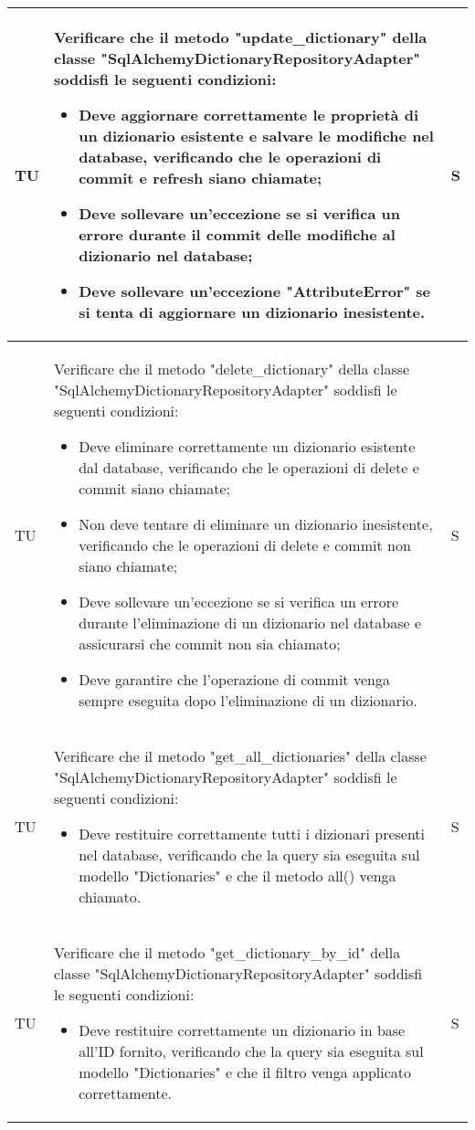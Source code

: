 \begin{adjustwidth}{-0.5cm}{-0.5cm}
\begin{longtable}{|P{1.5cm}|>{\raggedright}P{9.5cm}|>{\arraybackslash}P{1.5cm}|}
		\hline TU & Verificare che il metodo "update\_dictionary" della classe "SqlAlchemyDictionaryRepositoryAdapter" soddisfi le seguenti condizioni:
		\begin{itemize}
			\item Deve aggiornare correttamente le proprietà di un dizionario esistente e salvare le modifiche nel database, verificando che le operazioni di commit e refresh siano chiamate;
			\item Deve sollevare un'eccezione se si verifica un errore durante il commit delle modifiche al dizionario nel database;
			\item Deve sollevare un'eccezione "AttributeError" se si tenta di aggiornare un dizionario inesistente.
		\end{itemize} & S \\

		\hline TU & Verificare che il metodo "delete\_dictionary" della classe "SqlAlchemyDictionaryRepositoryAdapter" soddisfi le seguenti condizioni:
		\begin{itemize}
			\item Deve eliminare correttamente un dizionario esistente dal database, verificando che le operazioni di delete e commit siano chiamate;
			\item Non deve tentare di eliminare un dizionario inesistente, verificando che le operazioni di delete e commit non siano chiamate;
			\item Deve sollevare un'eccezione se si verifica un errore durante l'eliminazione di un dizionario nel database e assicurarsi che commit non sia chiamato;
			\item Deve garantire che l'operazione di commit venga sempre eseguita dopo l'eliminazione di un dizionario.
		\end{itemize} & S \\

		\hline TU & Verificare che il metodo "get\_all\_dictionaries" della classe "SqlAlchemyDictionaryRepositoryAdapter" soddisfi le seguenti condizioni:
		\begin{itemize}
			\item Deve restituire correttamente tutti i dizionari presenti nel database, verificando che la query sia eseguita sul modello "Dictionaries" e che il metodo all() venga chiamato.
		\end{itemize} & S \\

		\hline TU & Verificare che il metodo "get\_dictionary\_by\_id" della classe "SqlAlchemyDictionaryRepositoryAdapter" soddisfi le seguenti condizioni:
		\begin{itemize}
			\item Deve restituire correttamente un dizionario in base all'ID fornito, verificando che la query sia eseguita sul modello "Dictionaries" e che il filtro venga applicato correttamente.
		\end{itemize} & S \\


\end{longtable}
\end{adjustwidth}
